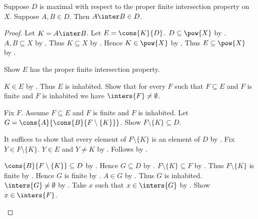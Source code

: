 \begin{lemma}\label{maximal_proper_fip_closed_under_intersections}
    Suppose $D$ is maximal with respect to the proper finite intersection property on $X$.
    Suppose $A,B\in D$.
    Then $A\inter B\in D$.
\end{lemma}
\begin{proof}
    Let $K=A\inter B$.
    Let $E=\cons{K}{D}$.
    $D\subseteq\pow{X}$ by
        .
    $A,B\subseteq X$ by .
    Thus $K\subseteq X$ by .
    Hence $K\in\pow{X}$ by .
    Thus $E\subseteq\pow{X}$ by .

    Show $E$ has the proper finite intersection property.
    \begin{subproof}
        $K\in E$ by .
        Thus $E$ is inhabited.
        Show that for every $F$ such that $F\subseteq E$ and $F$ is finite
            and $F$ is inhabited we have $\inters{F}\neq\emptyset$.
        \begin{subproof}
            Fix $F$.
            Assume $F\subseteq E$ and $F$ is finite and $F$ is inhabited.
            Let $G=\cons{A}{\cons{B}{F\setminus\{K\}}}$.
            Show $F\setminus\{K\}\subseteq D$.
            \begin{subproof}
                It suffices to show that every element of $F\setminus\{K\}$
                    is an element of $D$ by .
                Fix $Y\in F\setminus\{K\}$.
                $Y\in E$ and $Y\neq K$ by
                    .
                Follows by .
            \end{subproof}
            $\cons{B}{F\setminus\{K\}}\subseteq D$
                by .
            Hence $G\subseteq D$ by .
            $F\setminus\{K\}\subseteq F$ by .
            Thus $F\setminus\{K\}$ is finite
                by .
            Hence $G$ is finite by .
            $A\in G$ by .
            Thus $G$ is inhabited.
            $\inters{G}\neq\emptyset$ by
                .
            Take $x$ such that $x\in\inters{G}$ by .
            Show $x\in\inters{F}$.
            \begin{subproof}

\end{subproof}
\end{subproof}
\end{subproof}
\end{proof}

